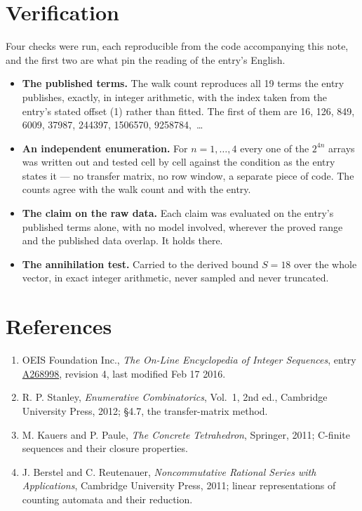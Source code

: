 \documentclass[11pt]{article}
\theoremstyle{definition}
\begin{document}
\section{Verification}

Four checks were run, each reproducible from the code accompanying this note, and the first two are what pin the reading of the entry's English.

\begin{itemize}

\item {\bfseries The published terms.} The walk count reproduces all 19 terms the entry publishes, exactly, in integer arithmetic, with the index taken from the entry's stated offset (1) rather than fitted. The first of them are 16, 126, 849, 6009, 37987, 244397, 1506570, 9258784,~\dots

\item {\bfseries An independent enumeration.} For $n = 1,\dots,4$ every one of the $2^{4n}$ arrays was written out and tested cell by cell against the condition as the entry states it --- no transfer matrix, no row window, a separate piece of code. The counts agree with the walk count and with the entry.

\item {\bfseries The claim on the raw data.} Each claim was evaluated on the entry's published terms alone, with no model involved, wherever the proved range and the published data overlap. It holds there.

\item {\bfseries The annihilation test.} Carried to the derived bound $S = 18$ over the whole vector, in exact integer arithmetic, never sampled and never truncated.

\end{itemize}

\section{References}

\begin{enumerate}

\item OEIS Foundation Inc., \emph{The On-Line Encyclopedia of Integer Sequences}, entry \href{https://oeis.org/A268998}{A268998}, revision 4, last modified Feb 17 2016.

\item R. P. Stanley, \emph{Enumerative Combinatorics}, Vol.~1, 2nd ed., Cambridge University Press, 2012; \S4.7, the transfer-matrix method.

\item M. Kauers and P. Paule, \emph{The Concrete Tetrahedron}, Springer, 2011; C-finite sequences and their closure properties.

\item J. Berstel and C. Reutenauer, \emph{Noncommutative Rational Series with Applications}, Cambridge University Press, 2011; linear representations of counting automata and their reduction.

\end{enumerate}
\end{document}
